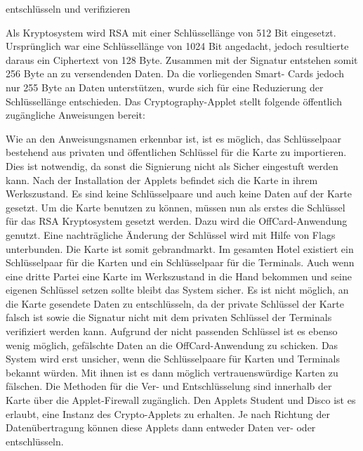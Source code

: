 entschlüsseln und verifizieren

Als Kryptosystem wird RSA mit einer Schlüssellänge von 512 Bit eingesetzt. Ursprünglich war eine Schlüssellänge von 1024 Bit angedacht, jedoch resultierte daraus ein Ciphertext von 128 Byte. Zusammen mit der Signatur entstehen somit 256 Byte an zu versendenden Daten. Da die vorliegenden Smart-
Cards jedoch nur 255 Byte an Daten unterstützen, wurde sich für eine Reduzierung der Schlüssellänge entschieden.
Das Cryptography-Applet stellt folgende öffentlich zugängliche Anweisungen bereit:


Wie an den Anweisungsnamen erkennbar ist, ist es möglich, das Schlüsselpaar bestehend aus privaten und öffentlichen Schlüssel für die Karte zu importieren. Dies ist notwendig, da sonst die Signierung nicht als Sicher eingestuft werden kann.
Nach der Installation der Applets befindet sich die Karte in ihrem Werkszustand. Es sind keine Schlüsselpaare und auch keine Daten auf der Karte gesetzt. 
Um die Karte benutzen zu können, müssen nun
als erstes die Schlüssel für das RSA Kryptosystem gesetzt werden. 
Dazu wird die OffCard-Anwendung genutzt. 
Eine nachträgliche Änderung der Schlüssel wird mit Hilfe von Flags unterbunden. Die Karte ist somit gebrandmarkt.
Im gesamten Hotel existiert ein Schlüsselpaar für die Karten und ein Schlüsselpaar für die Terminals.
Auch wenn eine dritte Partei eine Karte im Werkszustand in die Hand bekommen und seine eigenen Schlüssel setzen sollte bleibt das System sicher. Es ist nicht möglich, an die Karte gesendete Daten zu entschlüsseln, da der private Schlüssel der Karte falsch ist sowie die Signatur nicht mit dem privaten
Schlüssel der Terminals verifiziert werden kann. 
Aufgrund der nicht passenden Schlüssel ist es ebenso wenig möglich, gefälschte Daten an die OffCard-Anwendung zu schicken. Das System wird erst unsicher, wenn die Schlüsselpaare für Karten und Terminals bekannt würden. Mit ihnen ist es dann möglich vertrauenswürdige Karten zu fälschen.
Die Methoden für die Ver- und Entschlüsselung sind innerhalb der Karte über die Applet-Firewall zugänglich. Den Applets Student und Disco ist es erlaubt, eine Instanz des Crypto-Applets zu erhalten. 
Je nach Richtung der Datenübertragung können diese Applets dann entweder Daten ver- oder entschlüsseln. 

